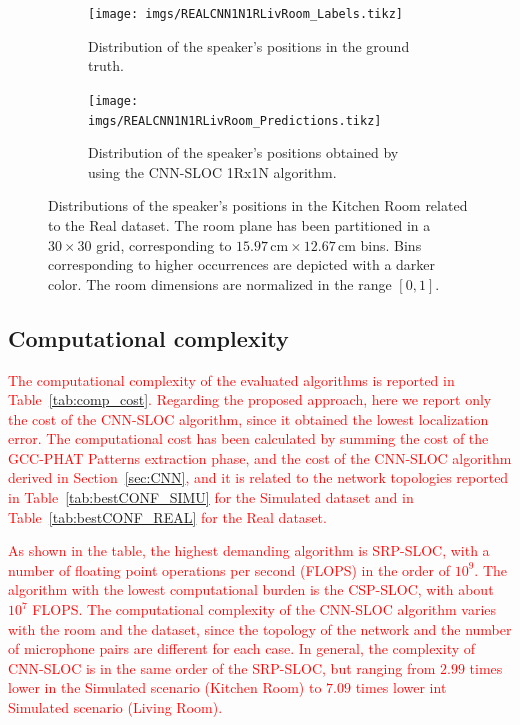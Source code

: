 \documentclass[review]{elsarticle}
\newcommand{\secref}[1]{Section~\ref{#1}}
\newcommand{\tableref}[1]{Table~\ref{#1}}
\begin{document}
\begin{figure}[t]
\centering
\begin{subfigure}[t]{0.45\textwidth}
\texttt{[image: imgs/REALCNN1N1RLivRoom\_Labels.tikz]}
\caption{Distribution of the speaker's positions in the ground truth.}\label{fig:distr_real_gt}
\end{subfigure}
\begin{subfigure}[t]{0.45\textwidth}
\texttt{[image: imgs/REALCNN1N1RLivRoom\_Predictions.tikz]}
\caption{Distribution of the speaker's positions obtained by using the CNN-SLOC 1Rx1N algorithm.}\label{fig:distr_real_pred}
\end{subfigure}
\caption{Distributions of the speaker's positions in the Kitchen Room related to the Real dataset. The room plane has been partitioned in a $30\times 30$ grid, corresponding to $15.97\,\text{cm} \times 12.67\,\text{cm}$ bins. Bins corresponding to higher occurrences are depicted with a darker color. The room dimensions are normalized in the range $[0,1]$.}\label{fig:distr_real}
\end{figure}


\subsection{Computational complexity}
\textcolor{red}{
The computational complexity of the evaluated algorithms is reported in \tableref{tab:comp_cost}. Regarding the proposed approach, here we report only the cost of the CNN-SLOC algorithm, since it obtained the lowest localization error. The computational cost has been calculated by summing the cost of the GCC-PHAT Patterns extraction phase, and the cost of the CNN-SLOC algorithm derived in \secref{sec:CNN}, and it is related to the network topologies reported in \tableref{tab:bestCONF_SIMU} for the Simulated dataset and in \tableref{tab:bestCONF_REAL} for the Real dataset.}

\textcolor{red}{
As shown in the table, the highest demanding algorithm is SRP-SLOC, with a number of floating point operations per second (FLOPS) in the order of $10^9$. The algorithm with the lowest computational burden is the CSP-SLOC, with about $10^7$ FLOPS. The computational complexity of the CNN-SLOC algorithm varies with the room and the dataset, since the topology of the network and the number of microphone pairs are different for each case. In general, the complexity of CNN-SLOC is in the same order of the SRP-SLOC, but ranging from $2.99$ times lower in the Simulated scenario (Kitchen Room) to $7.09$ times lower int Simulated scenario (Living Room).
}
\end{document}
